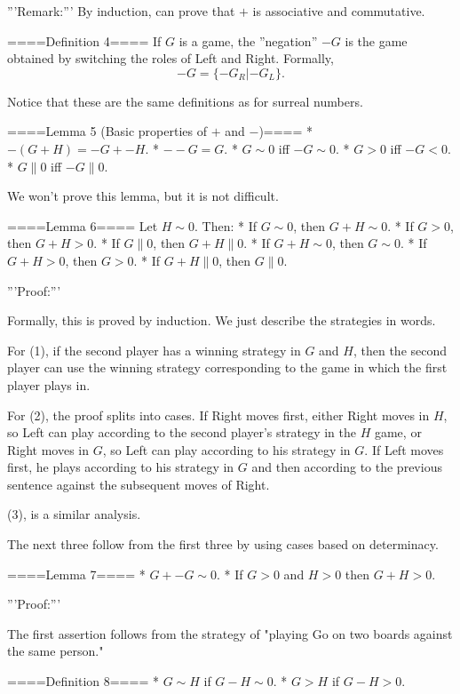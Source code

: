 '''Remark:'''
By induction, can prove that $+$ is associative and commutative. 

====Definition 4====
If $G$ is a game, the ''negation'' $-G$ is the game obtained by switching the roles of Left and Right. Formally,
$$-G=\{-G_R|-G_L\}.$$

Notice that these are the same definitions as for surreal numbers.

====Lemma 5 (Basic properties of $+$ and $-$)====
* $-(G+H)=-G+-H$.
* $--G=G$.
* $G\sim 0$ iff $-G\sim 0$.
* $G>0$ iff $-G<0$.
* $G\parallel 0$ iff $-G\parallel 0$.

We won't prove this lemma, but it is not difficult.

====Lemma 6====
Let $H\sim 0$. Then:
* If $G\sim 0$, then $G+H\sim 0$.
* If $G>0$, then $G+H>0$.
* If $G\parallel 0$, then $G+H\parallel 0$.
* If $G+H\sim 0$, then $G\sim 0$.
* If $G+H>0$, then $G>0$.
* If $G+H\parallel 0$, then $G\parallel 0$.

'''Proof:'''

Formally, this is proved by induction. We just describe the strategies in words.

For (1), if the second player has a winning strategy in $G$ and $H$, then the second player can use the winning strategy corresponding to the game in which the first player plays in.

For (2), the proof splits into cases. If Right moves first, either Right moves in $H$, so Left can play according to the second player's strategy in the $H$ game, or Right moves in $G$, so Left can play according to his strategy in $G$. If Left moves first, he plays according to his strategy in $G$ and then according to the previous sentence against the subsequent moves of Right.

(3), is a similar analysis.

The next three follow from the first three by using cases based on determinacy.

====Lemma 7====
* $G+ -G\sim 0$.
* If $G>0$ and $H>0$ then $G+H>0$.

'''Proof:'''

The first assertion follows from the strategy of "playing Go on two boards against the same person."


====Definition 8====
* $G\sim H$ if $G-H\sim 0$.
* $G>H$ if $G-H>0$.
